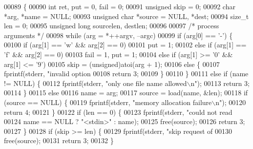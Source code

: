 \begin{DoxyCode}
{00089 \{
00090     \textcolor{keywordtype}{int} ret, put = 0, fail = 0;
00091     \textcolor{keywordtype}{unsigned} skip = 0;
00092     \textcolor{keywordtype}{char} *arg, *name = NULL;
00093     \textcolor{keywordtype}{unsigned} \textcolor{keywordtype}{char} *source = NULL, *dest;
00094     \textcolor{keywordtype}{size\_t} len = 0;
00095     \textcolor{keywordtype}{unsigned} \textcolor{keywordtype}{long} sourcelen, destlen;
00096 
00097     \textcolor{comment}{/* process arguments */}
00098     \textcolor{keywordflow}{while} (arg = *++argv, --argc)
00099         \textcolor{keywordflow}{if} (arg[0] == \textcolor{charliteral}{'-'}) \{
00100             \textcolor{keywordflow}{if} (arg[1] == \textcolor{charliteral}{'w'} && arg[2] == 0)
00101                 put = 1;
00102             \textcolor{keywordflow}{else} \textcolor{keywordflow}{if} (arg[1] == \textcolor{charliteral}{'f'} && arg[2] == 0)
00103                 fail = 1, put = 1;
00104             \textcolor{keywordflow}{else} \textcolor{keywordflow}{if} (arg[1] >= \textcolor{charliteral}{'0'} && arg[1] <= \textcolor{charliteral}{'9'})
00105                 skip = (unsigned)atoi(arg + 1);
00106             \textcolor{keywordflow}{else} \{
00107                 fprintf(stderr, \textcolor{stringliteral}{"invalid option %
00108                 \textcolor{keywordflow}{return} 3;
00109             \}
00110         \}
00111         \textcolor{keywordflow}{else} \textcolor{keywordflow}{if} (name != NULL) \{
00112             fprintf(stderr, \textcolor{stringliteral}{"only one file name allowed\(\backslash\)n"});
00113             \textcolor{keywordflow}{return} 3;
00114         \}
00115         \textcolor{keywordflow}{else}
00116             name = arg;
00117     source = load(name, &len);
00118     \textcolor{keywordflow}{if} (source == NULL) \{
00119         fprintf(stderr, \textcolor{stringliteral}{"memory allocation failure\(\backslash\)n"});
00120         \textcolor{keywordflow}{return} 4;
00121     \}
00122     \textcolor{keywordflow}{if} (len == 0) \{
00123         fprintf(stderr, \textcolor{stringliteral}{"could not read %
00124                 name == NULL ? \textcolor{stringliteral}{"<stdin>"} : name);
00125         free(source);
00126         \textcolor{keywordflow}{return} 3;
00127     \}
00128     \textcolor{keywordflow}{if} (skip >= len) \{
00129         fprintf(stderr, \textcolor{stringliteral}{"skip request of %
00130         free(source);
00131         \textcolor{keywordflow}{return} 3;
00132     \}
}}}}
\end{DoxyCode}
